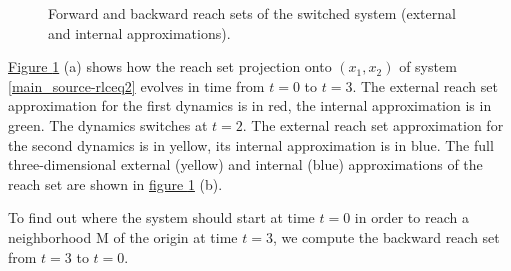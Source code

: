 \documentclass[letterpaper,10pt,english]{sphinxmanual}
\begin{document}
\begin{figure}[htbp]
\centering
\capstart

\caption{Forward and backward reach sets of the switched system
(external and internal approximations).}\label{main_source:rlcreachfig}\end{figure}

\hyperref[main_source:rlcreachfig]{Figure  \ref*{main_source:rlcreachfig}} (a) shows how the reach set projection onto
$(x_1, x_2)$ of system \eqref{main_source-rlceq2} evolves in time from $t=0$
to $t=3$. The external reach set approximation for the first
dynamics is in red, the internal approximation is in green. The dynamics
switches at $t=2$. The external reach set approximation for the
second dynamics is in yellow, its internal approximation is in blue. The
full three-dimensional external (yellow) and internal (blue)
approximations of the reach set are shown in \hyperref[main_source:rlcreachfig]{figure  \ref*{main_source:rlcreachfig}} (b).

To find out where the system should start at time $t=0$ in order
to reach a neighborhood M of the origin at time $t=3$, we compute
the backward reach set from $t=3$ to $t=0$.
\end{document}
